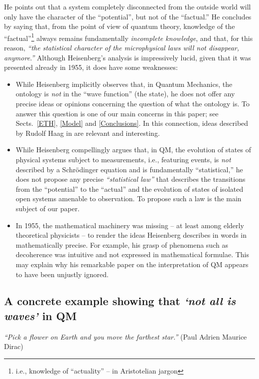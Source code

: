 \documentclass[12pt]{article}
\begin{document}
He points out that a system completely disconnected from the outside world will only
 have the character of the ``potential'', but not of the ``factual.'' He concludes by saying that,
from the point of view of quantum theory, knowledge of the ``factual''\footnote{i.e., knowledge of ``actuality'' --
in Aristotelian jargon} always remains fundamentally \textit{incomplete knowledge}, and that, for this reason,
\textit{``the statistical character of the microphysical laws will not disappear, anymore.''}
Although Heisenberg's analysis is impressively lucid, given that it was presented already
in 1955, it does have some weaknesses:
\begin{itemize}
\item{While Heisenberg implicitly observes that, in Quantum Mechanics, the ontology is \textit{not} in
the ``wave function'' (the state), he does not offer any precise ideas or opinions concerning the question of
what the ontology is. To answer this question is one of our main concerns in this paper; see Sects.~\ref{ETH}, \ref{Model}
and \ref{Conclusions}. In this connection, ideas described by {Rudolf Haag} in \cite{Rudolf} are relevant and
interesting.}
\item{While Heisenberg compellingly argues that, in QM, the evolution of states of physical systems subject to
measurements, i.e., featuring events, is \textit{not} described by a Schr\"odinger equation and is fundamentally
``statistical,'' he does not propose any precise \textit{``statistical law''} that describes the transitions from the
``potential'' to the ``actual'' and the evolution of states of isolated open systems amenable to observation.
To propose such a law is the main subject of our paper.}
\item{In 1955, the mathematical machinery was missing -- at least among elderly theoretical physicists --
to render the ideas Heisenberg describes in words in \cite{Heisenberg} mathematically precise.
For example, his grasp of phenomena such as decoherence was intuitive and not expressed in
mathematical formulae. This may explain why his remarkable paper on the interpretation of QM
appears to have been unjustly ignored.}
\end{itemize}

\subsection{A concrete example showing that \textit{`not all is waves'} in QM}
\hspace{0.5cm} \textit{``Pick a flower on Earth and you move the farthest star.''} (Paul Adrien Maurice Dirac)
\end{document}
